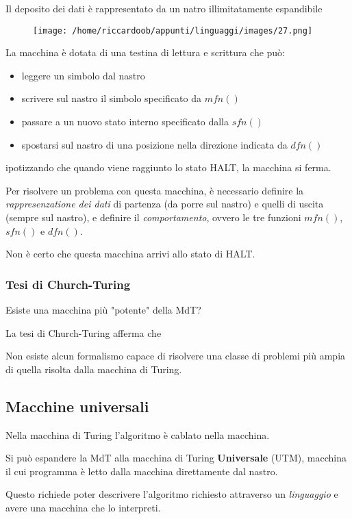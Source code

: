 Il deposito dei dati è rappresentato da un natro illimitatamente espandibile
\begin{figure}[H]
    \centering
    \texttt{[image: /home/riccardoob/appunti/linguaggi/images/27.png]}
\end{figure}

La macchina è dotata di una testina di lettura e scrittura che può:
\begin{itemize}
    \item leggere un simbolo dal nastro
    \item scrivere sul nastro il simbolo specificato da $mfn()$
    \item passare a un nuovo stato interno specificato dalla $sfn()$
    \item spostarsi sul nastro di una posizione nella direzione indicata da $dfn()$
\end{itemize}
ipotizzando che quando viene raggiunto lo stato HALT, la macchina si ferma.

Per risolvere un problema con questa macchina, è necessario definire la \textit{rappresenzatione dei dati} di partenza (da porre sul nastro) e quelli di uscita (sempre sul nastro), e definire il \textit{comportamento}, ovvero le tre funzioni $mfn()$, $sfn()$ e $dfn()$.

Non è certo che questa macchina arrivi allo stato di HALT.

\subsubsection{Tesi di Church-Turing}
Esiste una macchina più "potente" della MdT?

La tesi di Church-Turing afferma che
\begin{mdframed}[topline=false,bottomline=false,rightline=false]
    Non esiste alcun formalismo capace di risolvere una classe di problemi più ampia di quella risolta dalla macchina di Turing.
\end{mdframed}

\subsection{Macchine universali}
Nella macchina di Turing l'algoritmo è cablato nella macchina.

Si può espandere la MdT alla macchina di Turing \textbf{Universale} (UTM), macchina il cui programma è letto dalla macchina direttamente dal nastro.

Questo richiede poter descrivere l'algoritmo richiesto attraverso un \textit{linguaggio} e avere una macchina che lo interpreti.

